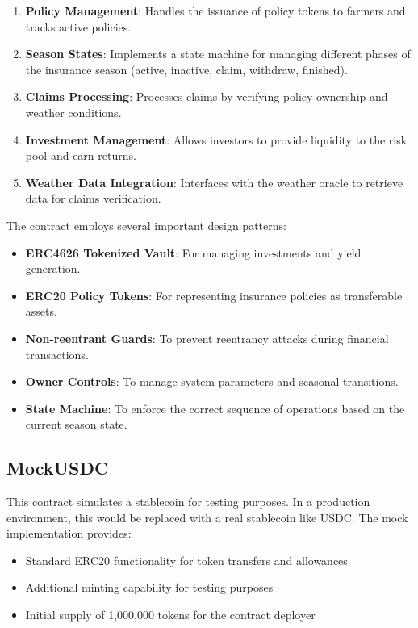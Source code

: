 \documentclass[11pt,a4paper]{article}
\begin{document}
	\begin{enumerate}
	    \item \textbf{Policy Management}: Handles the issuance of policy tokens to farmers and tracks active policies.
	    \item \textbf{Season States}: Implements a state machine for managing different phases of the insurance season (active, inactive, claim, withdraw, finished).
	    \item \textbf{Claims Processing}: Processes claims by verifying policy ownership and weather conditions.
	    \item \textbf{Investment Management}: Allows investors to provide liquidity to the risk pool and earn returns.
	    \item \textbf{Weather Data Integration}: Interfaces with the weather oracle to retrieve data for claims verification.
	\end{enumerate}

	The contract employs several important design patterns:
	\begin{itemize}
	    \item \textbf{ERC4626 Tokenized Vault}: For managing investments and yield generation.
	    \item \textbf{ERC20 Policy Tokens}: For representing insurance policies as transferable assets.
	    \item \textbf{Non-reentrant Guards}: To prevent reentrancy attacks during financial transactions.
	    \item \textbf{Owner Controls}: To manage system parameters and seasonal transitions.
	    \item \textbf{State Machine}: To enforce the correct sequence of operations based on the current season state.
	\end{itemize}

	\subsection{MockUSDC}\label{subsec:analysis-mock-usdc}
	This contract simulates a stablecoin for testing purposes.
    In a production environment, this would be replaced with a real stablecoin like USDC. The mock implementation provides:

	\begin{itemize}
	    \item Standard ERC20 functionality for token transfers and allowances
	    \item Additional minting capability for testing purposes
	    \item Initial supply of 1,000,000 tokens for the contract deployer
	\end{itemize}
\end{document}

